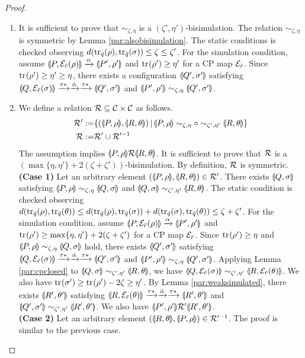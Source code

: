 \begin{proof}
 \begin{enumerate}
  \item It is sufficient to prove that $\sim_{\zeta, \eta}$ is 
	a $(\zeta', \eta')$-bisimulation. 
	The relation $\sim_{\zeta, \eta}$ is symmetric by Lemma \ref{par:alsobisimulation}.
	The static conditions is checked observing
	$d(\tr{\tilde q}{\rho}, \tr{\tilde q}{\sigma}) \le
	\zeta \le \zeta'$. For the simulation condition,
	assume 
	$\con{P}{\E_{\tilde r}(\rho)} \xrightarrow{\alpha}
	\con{P'}{\rho'}$ and $\tr{}{\rho'} \ge \eta'$
	for a CP map $\E_{\tilde r}$. Since $\tr{}{\rho'} \ge \eta' \ge
	\eta$, there exists a configuration $\con{Q'}{\sigma'}$
	satisfying $\con{Q}{\E_{\tilde r}(\sigma)} \weak{\hat \alpha} 
	\con{Q'}{\sigma'}$ and $\con{P'}{\rho'} \sim_{\zeta, \eta}
	\con{Q'}{\sigma'}$.
  \item We define a relation $\R \subseteq \C \times \C$ as follows.
	\begin{align*}
	 \R' :=& \{(\con{P}{\rho}, \con{R}{\theta})\,|\,
	            \con{P}{\rho} \sim_{\zeta, \eta} \circ
	 \sim_{\zeta', \eta'} \con{R}{\theta}\}\\
	 \R := & \R' \cup \R'^{-1}
	\end{align*}
	The assumption implies $\con{P}{\rho} \R \con{R}{\theta}$.
	It is sufficient to prove that $\R$ is a $(\max\{\eta,
	\eta'\}+2(\zeta + \zeta'))$-bisimulation. By definition,
	$\R$ is symmetric. \\
	{\bf (Case 1)} Let an arbitrary element
	$(\con{P}{\rho},\con{R}{\theta}) \in \R'$.
	There exists $\con{Q}{\sigma}$ satisfying
	$\con{P}{\rho} \sim_{\zeta, \eta} \con{Q}{\sigma}$ and
	$\con{Q}{\sigma} \sim_{\zeta', \eta'} \con{R}{\theta}$.
	The static condition is checked observing
	$d(\tr{\tilde q}{\rho}, \tr{\tilde q}{\theta}) \le
	d(\tr{\tilde q}{\rho}, \tr{\tilde q}{\sigma}) +
	d(\tr{\tilde q}{\sigma}, \tr{\tilde q}{\theta}) \le
	\zeta + \zeta'$. For the simulation condition, assume
	$\con{P}{\E_{\tilde r}(\rho)} \xrightarrow{\alpha}
	\con{P'}{\rho'}$ and $\tr{}{\rho'} \ge \max\{\eta,
	\eta'\}+2(\zeta + \zeta')$ for a CP map $\E_{\tilde r}$.
	Since $\tr{}{\rho'} \ge \eta$ and
 	$\con{P}{\rho} \sim_{\zeta, \eta} \con{Q}{\sigma}$
	hold, there exists
	$\con{Q'}{\sigma'}$ satisfying
	$\con{Q}{\E_{\tilde r}(\sigma)} \weak{\hat \alpha}
	\con{Q'}{\sigma'}$ and
	$\con{P'}{\rho'} \sim_{\zeta, \eta} \con{Q'}{\sigma'}$.
	Applying Lemma \ref{par:cpclosed} to
	$\con{Q}{\sigma} \sim_{\zeta', \eta'} \con{R}{\theta}$, we
	have
	$\con{Q}{\E_{\tilde r}(\sigma)} \sim_{\zeta', \eta'}
	\con{R}{\E_{\tilde r}(\theta)}$. We also have
	$\tr{}{\sigma'} \ge \tr{}{\rho'} - 2\zeta \ge \eta'$.
	By Lemma \ref{par:weaksimulated}, there exists
	$\con{R'}{\theta'}$
	satisfying $\con{R}{\E_{\tilde r}(\theta)} \weak{\hat \alpha}
	\con{R'}{\theta'}$ and $\con{Q'}{\sigma'} \sim_{\zeta', \eta'}
	\con{R'}{\theta'}$. We also have $\con{P'}{\rho'} \R' \con{R'}{\theta'}$.
	\\
	{\bf (Case 2)} Let an arbitrary element
	$(\con{R}{\theta}, \con{P}{\rho}) \in \R'^{-1}$.
	The proof is similar to the previous case.
 \end{enumerate}
\end{proof}

